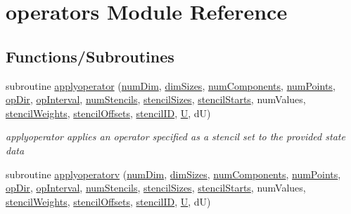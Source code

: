 \hypertarget{namespaceoperators}{}\section{operators Module Reference}
\label{namespaceoperators}
\subsection*{Functions/\+Subroutines}
\begin{DoxyCompactItemize}
\item 
subroutine \hyperlink{namespaceoperators_aee961d7de8b2c319cd0270f5ae735de7}{applyoperator} (\hyperlink{SATKernels_8H_a680185db8546de161968dabace9e94f1}{num\+Dim}, \hyperlink{SATKernels_8H_a338d2e6b5802f9ba652d355df0b1a04b}{dim\+Sizes}, \hyperlink{SimpleKernels_8H_abb39988074870d597c8d1cfcf61514ee}{num\+Components}, \hyperlink{ViscidKernels_8H_adf0bf75d0875d1bb42a5348bee7b7bfd}{num\+Points}, \hyperlink{OperatorKernels_8H_afc6f027cdb36bf6d86e573c2083e555b}{op\+Dir}, \hyperlink{WENOKernels_8H_a23d86f4608a92738225f87574392b273}{op\+Interval}, \hyperlink{OperatorKernels_8H_a3ebb77d78da88e132f012ab6788ff123}{num\+Stencils}, \hyperlink{OperatorKernels_8H_ad36f7e6638c24dc8cce030ebb48e32a4}{stencil\+Sizes}, \hyperlink{OperatorKernels_8H_ab81c9b92fc99d6a20e08f1ad1c9630b0}{stencil\+Starts}, num\+Values, \hyperlink{OperatorKernels_8H_a71782584f6f521c3d69ed8a53fbbbd59}{stencil\+Weights}, \hyperlink{OperatorKernels_8H_aace4e878476c6638c99ce2be58848e52}{stencil\+Offsets}, \hyperlink{OperatorKernels_8H_a681701e0402fff5dd66637c1c99e34aa}{stencil\+ID}, \hyperlink{SimpleKernels_8H_aca4ab6143606c908fb1a7de286ddddae}{U}, dU)
\begin{DoxyCompactList}\small\item\em applyoperator applies an operator specified as a stencil set to the provided state data \end{DoxyCompactList}\item 
subroutine \hyperlink{namespaceoperators_ad6db84fac96d0301e9802d7504d4b927}{applyoperatorv} (\hyperlink{SATKernels_8H_a680185db8546de161968dabace9e94f1}{num\+Dim}, \hyperlink{SATKernels_8H_a338d2e6b5802f9ba652d355df0b1a04b}{dim\+Sizes}, \hyperlink{SimpleKernels_8H_abb39988074870d597c8d1cfcf61514ee}{num\+Components}, \hyperlink{ViscidKernels_8H_adf0bf75d0875d1bb42a5348bee7b7bfd}{num\+Points}, \hyperlink{OperatorKernels_8H_afc6f027cdb36bf6d86e573c2083e555b}{op\+Dir}, \hyperlink{WENOKernels_8H_a23d86f4608a92738225f87574392b273}{op\+Interval}, \hyperlink{OperatorKernels_8H_a3ebb77d78da88e132f012ab6788ff123}{num\+Stencils}, \hyperlink{OperatorKernels_8H_ad36f7e6638c24dc8cce030ebb48e32a4}{stencil\+Sizes}, \hyperlink{OperatorKernels_8H_ab81c9b92fc99d6a20e08f1ad1c9630b0}{stencil\+Starts}, num\+Values, \hyperlink{OperatorKernels_8H_a71782584f6f521c3d69ed8a53fbbbd59}{stencil\+Weights}, \hyperlink{OperatorKernels_8H_aace4e878476c6638c99ce2be58848e52}{stencil\+Offsets}, \hyperlink{OperatorKernels_8H_a681701e0402fff5dd66637c1c99e34aa}{stencil\+ID}, \hyperlink{SimpleKernels_8H_aca4ab6143606c908fb1a7de286ddddae}{U}, dU)

\end{DoxyCompactItemize}
